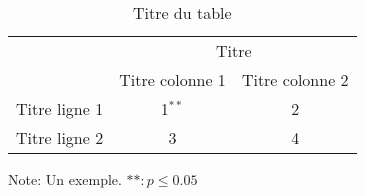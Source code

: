 \begin{table}[H]
		\begin{center}
			\caption{Titre du table} \label{table}
			\begin{tabular}{l|cc}
				\toprule \toprule
				& \multicolumn{2}{c}{Titre} \\
				& Titre colonne 1 & Titre colonne 2 \\ \midrule
				Titre ligne 1 & 1$^{**}$ & 2 \\
				Titre ligne 2 & 3 & 4 \\ \bottomrule \bottomrule
			\end{tabular}
		\end{center}
		\begin{footnotesize}
			\flushleft
			Note: Un exemple. $**: p \leq 0.05$
		\end{footnotesize}
	\end{table}